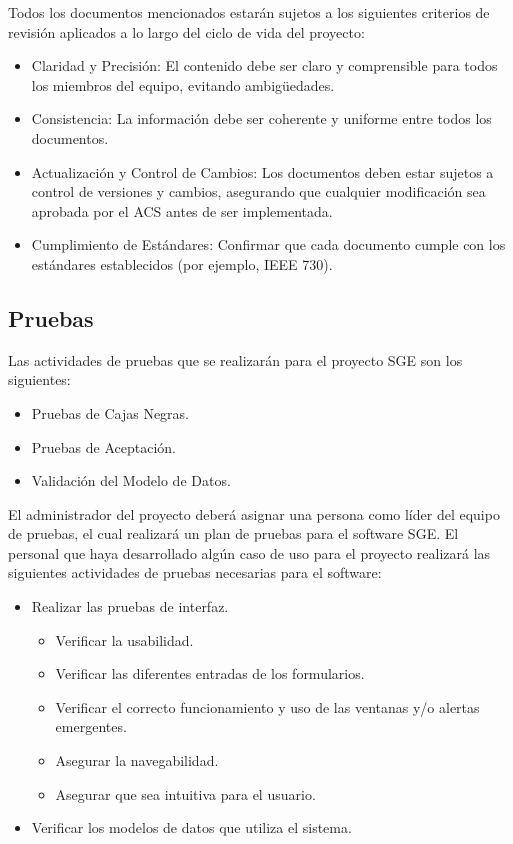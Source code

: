 \documentclass[a4paper,10pt]{article}
\begin{document}
	Todos los documentos mencionados estarán sujetos a los siguientes criterios de revisión aplicados a lo largo del ciclo de vida del proyecto:
	\begin{itemize}
		\item Claridad y Precisión: El contenido debe ser claro y comprensible para todos los miembros del equipo, evitando ambigüedades.
		\item Consistencia: La información debe ser coherente y uniforme entre todos los documentos.
		\item Actualización y Control de Cambios: Los documentos deben estar sujetos a control de versiones y cambios, asegurando que cualquier modificación sea aprobada por el ACS antes de ser implementada.
		\item Cumplimiento de Estándares: Confirmar que cada documento cumple con los estándares establecidos (por ejemplo, IEEE 730).
	\end{itemize}
	
	\subsection{Pruebas}
	Las actividades de pruebas que se realizarán para el proyecto SGE son los siguientes:
	\begin{itemize}
		\item Pruebas de Cajas Negras.
		\item Pruebas de Aceptación.
		\item Validación del Modelo de Datos.
	\end{itemize}
	
	El administrador del proyecto deberá asignar una persona como líder del equipo de pruebas, el cual realizará un plan de pruebas para el software SGE. El personal que haya desarrollado algún caso de uso para el proyecto realizará las siguientes actividades de pruebas necesarias para el software:
	\begin{itemize}
		\item Realizar las pruebas de interfaz.
		\begin{itemize}
			\item Verificar la usabilidad.
			\item Verificar las diferentes entradas de los formularios.
			\item Verificar el correcto funcionamiento y uso de las ventanas y/o alertas emergentes.
			\item Asegurar la navegabilidad.
			\item Asegurar que sea intuitiva para el usuario.
		\end{itemize}
		\item Verificar los modelos de datos que utiliza el sistema.
	\end{itemize}
	
\end{document}
